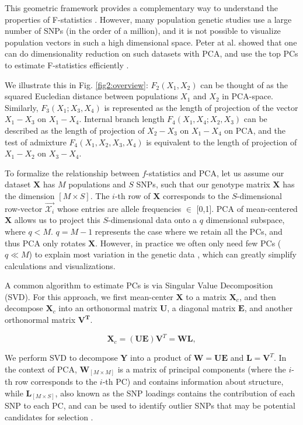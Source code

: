 \documentclass[12pt, letterpaper]{article}
\newcommand{\MX}{\mathbf{X}}
\begin{document}
This geometric framework provides a complementary way to understand the properties of F-statistics \cite{oteo-garcia_geometrical_2021}. However, many population genetic studies use a large number of SNPs (in the order of a million), and it is not possible to visualize population vectors in such a high dimensional space. Peter at al. showed that one can do dimensionality reduction on such datasets with PCA, and use the top PCs to estimate F-statistics efficiently \cite{peter_geometric_2022}.

We illustrate this in Fig. \ref{fig2:overview}:  $F_2(X_1,X_2)$ can be thought of as the squared Eucledian distance between populations $X_1$ and $X_2$ in PCA-space. Similarly, $F_3(X_1;X_3,X_4)$ is represented as the length of projection of the vector $X_1-X_3$ on $X_1-X_4$. Internal branch length $F_4(X_1,X_4;X_2,X_3)$ can be described as the length of projection of $X_2-X_3$ on $X_1-X_4$ on PCA, and the test of admixture $F_4(X_1,X_2,X_3,X_4)$ is equivalent to the length of projection of $X_1-X_2$ on $X_3-X_4$. 


To formalize the relationship between $f$-statistics and PCA, let us assume our dataset $\mathbf{X}$ has $M$ populations and $S$ SNPs, such that our genotype matrix $\MX$ has the dimension $[M \times S]$. The $i$-th row of $\MX$ corresponds to the $S$-dimensional row-vector $\Vec{\mathcal{X}_i}$ whose entries are  allele frequencies $\in$ [0,1]. PCA of mean-centered $\MX$ allows us to project this $S$-dimensional data onto a $q$ dimensional subspace, where $q < M$. $q = M-1$ represents the case where we retain all the PCs, and thus PCA only rotates $\MX$. However, in practice we often only need few PCs ($q \ll M$) to explain most variation in the genetic data \cite{peter_geometric_2022}, which can greatly simplify calculations and visualizations. 

A common algorithm to estimate PCs is via Singular Value Decomposition (SVD). For this approach, we first mean-center $\MX$ to a  matrix $\MX_c$, and then decompose $\MX_c$ into an orthonormal matrix $\mathbf{U}$, a diagonal matrix $\mathbf{E}$, and another orthonormal matrix $\mathbf{V^T}$.

$$\MX_c = (\mathbf{U}\mathbf{E}) \mathbf{V}^T = \mathbf{WL},$$

 We perform SVD to decompose $\mathbf{Y}$ into a product of $\mathbf{W} = \mathbf{UE}$ and $\mathbf{L} = \mathbf{V}^T$. In the context of PCA, $\mathbf{W}_{[M\times M]}$ is a matrix of principal components (where the $i$-th row corresponds to the $i$-th PC) and contains information about structure, while $\mathbf{L}_{[M\times S]}$, also known as the SNP loadings contains the contribution of each SNP to each PC, and can be used to identify outlier SNPs that may be potential candidates for selection \cite{gower_distance_1966}. 
\end{document}
